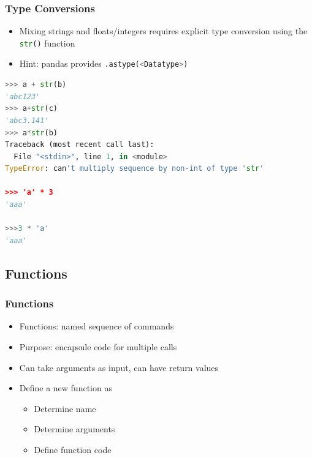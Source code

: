 \documentclass[ngerman]{beamer}
\begin{document}
\begin{frame}[containsverbatim]
\frametitle{Type Conversions}

\begin{itemize}
\item Mixing strings and floats/integers requires explicit type conversion using the \lstinline[language={Python}]{str()} function
\item Hint: pandas provides \lstinline[morekeywords={astype},language={Python}]{.astype(<Datatype>)} 
\end{itemize}

\begin{lstlisting}[language={Python}]
>>> a + str(b)
'abc123'
>>> a+str(c)
'abc3.141'
>>> a*str(b)
Traceback (most recent call last):
  File "<stdin>", line 1, in <module>
TypeError: can't multiply sequence by non-int of type 'str'

>>> 'a' * 3
'aaa'

>>>3 * 'a'
'aaa'
\end{lstlisting}


\end{frame}

\subsection{Functions}


\begin{frame}
\frametitle{Functions}

\begin{itemize}
\item Functions: named sequence of commands
\item Purpose: encapsule code for multiple calls
\item Can take arguments as input, can have return values
\item Define a new function as
\begin{itemize}
	\item Determine name
	\item Determine arguments
	\item Define function code
	\end{itemize}
\end{itemize}
\end{frame}
\end{document}
